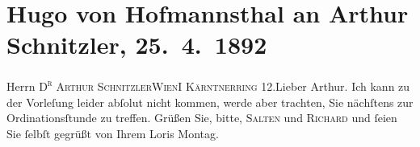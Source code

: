 

         
         \renewcommand{\erwaehntePersonen}{Personen: Richard Beer-Hofmann, Felix Salten}
         \renewcommand{\erwaehnteOrte}{Orte: Kärntnerring, Wien}
         \renewcommand{\erwaehnteWerke}{}
               \section[Hugo von Hofmannsthal an Arthur Schnitzler, 25. 4. 1892]{ Hugo von Hofmannsthal an Arthur Schnitzler, 25. 4. 1892}\nopagebreak{}\rehead{ }\begin{ledgroupsized}[t]{13cm}\normalsize\beginnumbering \toendnotes[C]{\smallbreak\pagebreak[2]} 
\pstart{}{\pb}Herrn \textsc{D\textsuperscript{r} Arthur Schnitzler}\pend{}\pstart{}\textsc{Wien}\pend{}\pstart{}\textsc{I Kärntnerring 12.}\pend{}{\bigskip}\pstart{}{\pb}Lieber Arthur.\pend\pstart
           Ich kann zu der Vorleſung leider abſolut nicht kommen, werde aber trachten, Sie
               nächſtens zur Ordinationsſtunde zu treffen.\pend
           \pstart
           Grüßen Sie, bitte, \textsc{Salten} und \textsc{Richard} und ſeien Sie ſelbſt gegrüßt von Ihrem \pend
           \pstart \spacefill\mbox{Loris}\pend{}\pstart
           Montag.\pend
           
         
         \endnumbering{}\end{ledgroupsized}  \newcommand{\dateiname}{L00098}\newcommand{\titel}{Hugo von Hofmannsthal an Arthur Schnitzler, 25. 4. 1892}\newcommand{\editorInnen}{Martin Anton Müller und Gerd-Hermann Susen}
      